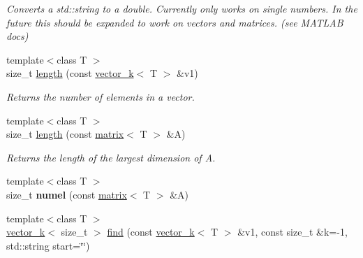 \begin{DoxyCompactItemize}
\begin{DoxyCompactList}\small\item\em Converts a std\-::string to a double. Currently only works on single numbers. In the future this should be expanded to work on vectors and matrices. (see M\-A\-T\-L\-A\-B docs) \end{DoxyCompactList}\item 
\hypertarget{namespacekeycpp_aa605bad9095a6c529656926dc4fb35cf}{{\footnotesize template$<$class T $>$ }\\size\-\_\-t \hyperlink{namespacekeycpp_aa605bad9095a6c529656926dc4fb35cf}{length} (const \hyperlink{classkeycpp_1_1vector__k}{vector\-\_\-k}$<$ T $>$ \&v1)}\label{namespacekeycpp_aa605bad9095a6c529656926dc4fb35cf}

\begin{DoxyCompactList}\small\item\em Returns the number of elements in a vector. \end{DoxyCompactList}\item 
\hypertarget{namespacekeycpp_a9c30ad952d4422425a171c12bdf33947}{{\footnotesize template$<$class T $>$ }\\size\-\_\-t \hyperlink{namespacekeycpp_a9c30ad952d4422425a171c12bdf33947}{length} (const \hyperlink{classkeycpp_1_1matrix}{matrix}$<$ T $>$ \&A)}\label{namespacekeycpp_a9c30ad952d4422425a171c12bdf33947}

\begin{DoxyCompactList}\small\item\em Returns the length of the largest dimension of A. \end{DoxyCompactList}\item 
\hypertarget{namespacekeycpp_adcbcd3d38aa0721f2556422eb06cad7d}{{\footnotesize template$<$class T $>$ }\\size\-\_\-t {\bfseries numel} (const \hyperlink{classkeycpp_1_1matrix}{matrix}$<$ T $>$ \&A)}\label{namespacekeycpp_adcbcd3d38aa0721f2556422eb06cad7d}

\item 
\hypertarget{namespacekeycpp_afbcf6804c0bcef12904db8880c451cea}{{\footnotesize template$<$class T $>$ }\\\hyperlink{classkeycpp_1_1vector__k}{vector\-\_\-k}$<$ size\-\_\-t $>$ \hyperlink{namespacekeycpp_afbcf6804c0bcef12904db8880c451cea}{find} (const \hyperlink{classkeycpp_1_1vector__k}{vector\-\_\-k}$<$ T $>$ \&v1, const size\-\_\-t \&k=-\/1, std\-::string start=\char`\"{}\char`\"{})}\label{namespacekeycpp_afbcf6804c0bcef12904db8880c451cea}


\end{DoxyCompactItemize}
